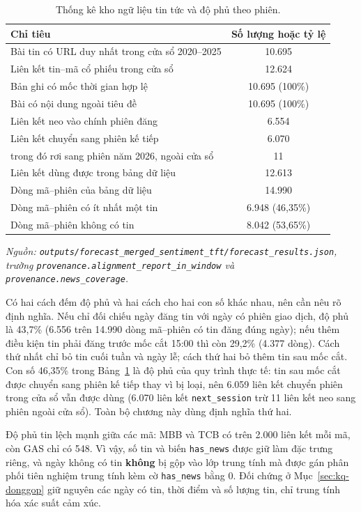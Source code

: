 \begin{table}[H]
  \centering
  \caption{Thống kê kho ngữ liệu tin tức và độ phủ theo phiên.}
  \label{tab:kq-news-stats}
  \begin{tabular}{p{8.4cm} c}
    \toprule
    Chỉ tiêu & Số lượng hoặc tỷ lệ \\
    \midrule
    Bài tin có URL duy nhất trong cửa sổ 2020--2025 & 10.695 \\
    Liên kết tin--mã cổ phiếu trong cửa sổ & 12.624 \\
    Bản ghi có mốc thời gian hợp lệ & 10.695 (100\%) \\
    Bài có nội dung ngoài tiêu đề & 10.695 (100\%) \\
    Liên kết neo vào chính phiên đăng & 6.554 \\
    Liên kết chuyển sang phiên kế tiếp & 6.070 \\
    \quad trong đó rơi sang phiên năm 2026, ngoài cửa sổ & 11 \\
    Liên kết dùng được trong bảng dữ liệu & 12.613 \\
    Dòng mã--phiên của bảng dữ liệu & 14.990 \\
    Dòng mã--phiên có ít nhất một tin & 6.948 (46,35\%) \\
    Dòng mã--phiên không có tin & 8.042 (53,65\%) \\
    \bottomrule
  \end{tabular}
\noindent\textit{Nguồn: \texttt{outputs/forecast\_merged\_sentiment\_tft/forecast\_results.json}, trường \texttt{provenance.alignment\_report\_in\_window} và \texttt{provenance.news\_coverage}.}
\end{table}

Có hai cách đếm độ phủ và hai cách cho hai con số khác nhau, nên cần nêu rõ định nghĩa.
Nếu chỉ đối chiếu ngày đăng tin với ngày có phiên giao dịch, độ phủ là 43,7\%
(6.556 trên 14.990 dòng mã--phiên có tin đăng đúng ngày); nếu thêm điều kiện tin
phải đăng trước mốc cắt 15:00 thì còn 29,2\% (4.377 dòng). Cách thứ nhất chỉ bỏ
tin cuối tuần và ngày lễ; cách thứ hai bỏ thêm tin sau mốc cắt. Con số 46,35\% trong Bảng~\ref{tab:kq-news-stats}
là độ phủ của quy trình thực tế: tin sau mốc cắt được chuyển sang phiên kế tiếp
thay vì bị loại, nên 6.059 liên kết chuyển phiên trong cửa sổ vẫn được dùng
(6.070 liên kết \texttt{next\_session} trừ 11 liên kết neo sang phiên ngoài cửa
sổ). Toàn bộ chương này dùng định nghĩa thứ hai.

Độ phủ tin lệch mạnh giữa các mã: MBB và TCB có trên 2.000 liên kết mỗi mã, còn GAS chỉ
có 548. Vì vậy, số tin và biến \texttt{has\_news} được giữ làm đặc trưng riêng, và ngày
không có tin \textbf{không} bị gộp vào lớp trung tính mà được gán phân phối tiên nghiệm trung tính kèm cờ
\texttt{has\_news} bằng 0. Đối chứng ở Mục~\ref{sec:kq-donggop} giữ nguyên các ngày có
tin, thời điểm và số lượng tin, chỉ trung tính hóa xác suất cảm xúc.

